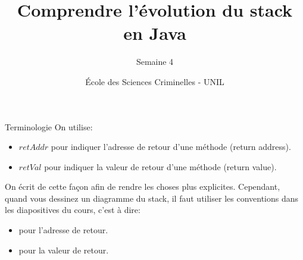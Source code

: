 \documentclass[aspectratio=169]{beamer}
\title{Comprendre l'évolution du stack en Java}
\subtitle{Semaine 4}
\author{École des Sciences Criminelles - UNIL}
\date{}
\begin{document}
\begin{frame}
\titlepage
\end{frame}

\begin{frame}{Terminologie}
    On utilise:
    \begin{itemize}
        \item $retAddr$ pour indiquer l'adresse de retour d'une méthode (return address).
        \item $retVal$ pour indiquer la valeur de retour d'une méthode (return value).
    \end{itemize}
\vspace{1cm}
On écrit de cette façon afin de rendre les choses plus explicites. Cependant, quand vous dessinez un diagramme du stack, il faut utiliser les conventions dans les diapositives du cours, c'est à dire:
\vspace{1cm}
\begin{itemize}
    \item {} pour l'adresse de retour.
    \item {} pour la valeur de retour.
\end{itemize}
\end{frame}

    

        
\end{document}
